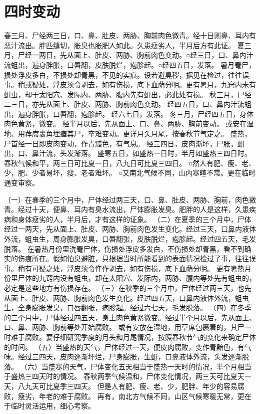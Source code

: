 \documentclass[12pt,UTF8]{ctexbook}
\begin{document}
\chapter{四时变动}

春三月、尸经两三日，口、鼻、肚皮、两胁、胸前肉色微青。经十日则鼻、耳内有恶汁流出。胖匹缝切，胀臭也胀肥人如此。久患瘦劣人，半月后方有此证。
夏三月，尸经一两日，先从面上、肚皮、两胁、胸前肉色变动。○经三日，口、鼻内汁流蛆出，遍身胖胀，口唇翻，皮肤脱烂，疱胗起。○经四五日，发落。
暑月罨尸，损处浮皮多白，不损处却青黑，不见的实痕。设若避臭秽，据见在检过，往往误事。稍或疑处，浮皮须令剥去，如有伤损，底下血荫分明。更有暑月，九窍内未有蛆虫，却于太阳穴、发际内、两胁、腹内先有蛆出，必此处有损。
秋三月，尸经二三日，亦先从面上、肚皮、两胁、胸前肉色变动。
经四五日，口、鼻内汁流蛆出，遍身胖胀，口唇翻，疱胗起。
经六七日，发落。
冬三月，尸经四五日，身体肉色黄紧，微变。
经半月以后，先从面上、口、鼻、两胁、胸前变动。
或安在湿地、用荐席裹角埋瘗其尸，卒难变动。更详月头月尾，按春秋节气定之。
盛热，尸首经一日即皮肉变动，作青黯色，有气息。
经三四日，皮肉渐坏，尸胀，蛆出，口、鼻汁流，头发渐落。
盛寒五日，如盛热一日时，半月如盛热三四日时。
春秋气候和平，两三日可比夏一日，八九日可比夏三四日。
○然人有肥、瘦、老、少，肥、少者易坏，瘦、老者难坏。
○又南北气候不同，山内寒暄不常。更在临时通变审察。



（一）在春季的三个月中，尸体经过两三天，口、鼻、肚皮、两胁、胸前，肉色微青。经过十天，便鼻、耳内有臭水流出，尸体膨胀发臭。肥胖的人是这样，久患疾病和身体瘦劣的人，半月后，才有这样的证象。
（二）在夏季的三个月中，尸体经过一两天，先从面上、肚皮、两胁、胸前肉色发生变化。经过三天，口鼻内液体外流，蛆虫生，周身膨胀发臭，口唇翻张，皮肤脱烂，疱胗起。经过四五天，毛发脱落。
在暑热月份里洗罨尸体，伤损处浮皮多发白，不伤损处却青黑，看不到确实的伤痕所在。假如怕臭避脏，只根据当时所能看到的表面情况检过了事，往往误事。稍有可疑之处，浮皮须令仵作剥去，如有伤损，底下血荫分明。
更有暑热月份里尸体的九窍内没有蛆虫，却在太阳穴、发际内，两胁、腹内等处先有蛆虫的，必定是这些地方有伤损存在。
（三）在秋季的三个月中，尸体经过两三天，也先从面上、肚皮、两胁、胸前肉色发生变化。经过四五天，口鼻内液体外流，蛆虫生，全身膨胀发臭，口唇翻张，疱胗起。经过六七天，毛发脱落。
（四）在冬季的三个月中，尸体经过四五天，身上肉色黄紧微变。经过半个月以后，先从面上、口、鼻、两胁、胸前等处开始腐败。
或有安放在湿地，用草席包裹着的，其尸一时难于腐败。要仔细研究季度的月头和月尾情况，按照春秋节气的变化来确定尸体的时间。
（五）当盛热的天气，尸体经过一天，便皮肉腐败，变作青黯色，有气味。经过三四天，皮肉逐渐坏烂，尸身膨胀，生蛆，口鼻液体外流，头发逐渐脱落。
（六）当盛寒的天气，尸体变化五天相当于盛热一天时的情况，半个月相当于盛热三四天时的情况。
春秋两季气候温和，尸体变化情况，两三天可比夏天一天，八九天可比夏季三四天。
但是人有肥、瘦、老、少，肥胖、年少的容易腐败，瘦劣，年老的难于腐败。
再有，南北方气候不同，山区气候寒暖无常，更在于临时灵活运用，细心考察。
\end{document}

